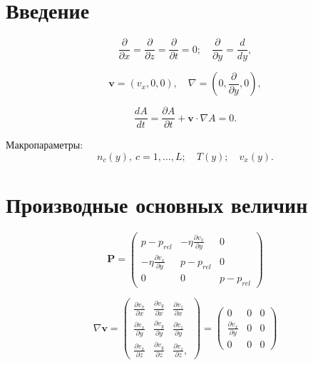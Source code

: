 \documentclass[12pt]{article}
\begin{document}
\section{Введение}
\begin{equation}
  \frac{\partial}{\partial x} = \frac{\partial}{\partial z} = \frac{\partial}{\partial t} = 0; \quad \frac{\partial}{\partial y} = \frac{d}{d y},
\end{equation}

\begin{equation}
  \mathbf{v} = (v_{x}, 0, 0),\quad \nabla=\left(0, \frac{\partial}{\partial y}, 0 \right),
\end{equation}

\begin{equation}
  \frac{d A}{d t} = \frac{\partial A}{\partial t} + \mathbf{v} \cdot \nabla A = 0.
\end{equation}

Макропараметры:
\begin{equation}
  n_{c}(y),\:c=1,\ldots,L;\quad T(y);\quad v_{x}(y).
\end{equation}



\section{Производные основных величин}

\begin{equation}
  \mathbf{P} =
  \begin{pmatrix}
  p - p_{rel} & -\eta \frac{\partial v_{x}}{\partial y} & 0 \\
  -\eta \frac{\partial v_{x}}{\partial y} & p - p_{rel} & 0 \\
  0 & 0 & p - p_{rel}
  \end{pmatrix}
\end{equation}

\begin{equation}
  \nabla \mathbf{v} =
  \begin{pmatrix}
  \frac{\partial v_{x}}{\partial x} & \frac{\partial v_{y}}{\partial x} & \frac{\partial v_{z}}{\partial x} \\
  \frac{\partial v_{x}}{\partial y} & \frac{\partial v_{y}}{\partial y} & \frac{\partial v_{z}}{\partial y} \\
  \frac{\partial v_{x}}{\partial z} & \frac{\partial v_{y}}{\partial z} & \frac{\partial v_{z}}{\partial z},
  \end{pmatrix}
  =
  \begin{pmatrix}
  0 & 0 & 0 \\
  \frac{\partial v_{x}}{\partial y} & 0 & 0 \\
  0 & 0 & 0
  \end{pmatrix}
\end{equation}
\end{document}
